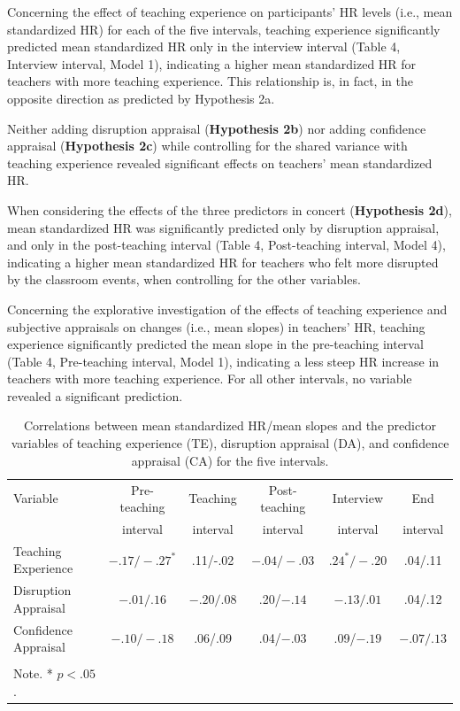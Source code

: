 \documentclass[preprint, 3p,
authoryear]{elsarticle} %
\begin{document}
Concerning the effect of teaching experience on participants' HR levels
(i.e., mean standardized HR) for each of the five intervals, teaching
experience significantly predicted mean standardized HR only in the
interview interval (Table 4, Interview interval, Model 1), indicating a
higher mean standardized HR for teachers with more teaching experience.
This relationship is, in fact, in the opposite direction as predicted by
Hypothesis 2a.

Neither adding disruption appraisal (\textbf{Hypothesis 2b}) nor adding
confidence appraisal (\textbf{Hypothesis 2c}) while controlling for the
shared variance with teaching experience revealed significant effects on
teachers' mean standardized HR.

When considering the effects of the three predictors in concert
(\textbf{Hypothesis 2d}), mean standardized HR was significantly
predicted only by disruption appraisal, and only in the post-teaching
interval (Table 4, Post-teaching interval, Model 4), indicating a higher
mean standardized HR for teachers who felt more disrupted by the
classroom events, when controlling for the other variables.

Concerning the explorative investigation of the effects of teaching
experience and subjective appraisals on changes (i.e., mean slopes) in
teachers' HR, teaching experience significantly predicted the mean slope
in the pre-teaching interval (Table 4, Pre-teaching interval, Model 1),
indicating a less steep HR increase in teachers with more teaching
experience. For all other intervals, no variable revealed a significant
prediction.

\renewcommand{\arraystretch}{1.5}

\begin{table}[ht]
    \centering
    \begin{tabularx}{\textwidth}{lccccc}
        \toprule
        Variable & Pre-teaching & Teaching & Post-teaching & Interview & End \\
        & interval & interval & interval & interval & interval \\
        \midrule
        Teaching Experience & $- .17/ - .27^*$ & .11/-.02 & $- .04/-.03$ & $.24^*/-.20$ & .04/.11 \\
        Disruption Appraisal & $- .01/.16$ & $- .20/.08$ & .20/$- .14$ & $- .13/.01$ & .04/.12 \\
        Confidence Appraisal & $- .10/ - .18$ & .06/.09 & .04/$- .03$ & .09/$- .19$ & $- .07/.13$ \\
        \bottomrule \\
          Note. * $p < .05$.
    \end{tabularx}
    \caption{Correlations between mean standardized HR/mean slopes and the predictor variables of teaching experience (TE), disruption appraisal (DA), and confidence appraisal (CA) for the five intervals.}
    \label{tab_3}
\end{table}


\end{document}
